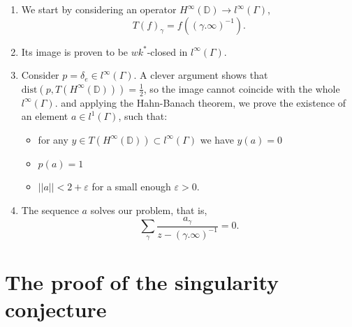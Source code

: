 \documentclass[11pt]{article}
\begin{document}
\begin{enumerate}
	\item We start by considering an operator $H^\infty(\mathbb{D}) \rightarrow l^\infty(\Gamma)$, 
	\[
	T(f)_\gamma = f((\gamma.\infty)^{-1}).
	\]
	\item Its image is proven to be $wk^*$-closed in $l^\infty(\Gamma)$.
	\item Consider $p = \delta_{e} \in l^\infty(\Gamma)$. A clever argument shows that \\ $\text{dist}(p, T(H^\infty(\mathbb{D}))) = \frac{1}{2}$, so the image cannot coincide with the whole $l^\infty(\Gamma)$. and applying the Hahn-Banach theorem, we prove the existence of an element $a \in l^1(\Gamma)$, such that:
	\begin{itemize}
		\item for any $y \in T(H^\infty(\mathbb{D})) \subset l^\infty(\Gamma)$ we have $y(a) = 0$
		\item $p(a) = 1$
		\item $||a|| < 2 + \varepsilon$ for a small enough $\varepsilon > 0$.
	\end{itemize}
	\item The sequence $a$ solves our problem, that is,
	\[
	\sum_{\gamma} \dfrac{a_\gamma}{z - (\gamma.\infty)^{-1}} = 0.
	\]
\end{enumerate}

\section{The proof of the singularity conjecture}
\label{The proof of the singularity conjecture}
\end{document}
